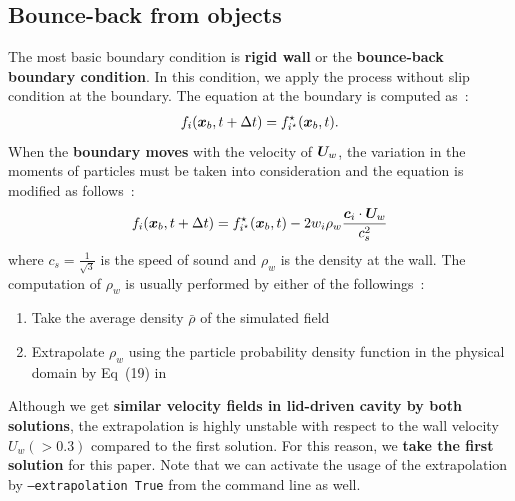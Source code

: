 \subsection{Bounce-back from objects}\label{boundary-wall-settings}
The most basic boundary condition is 
{\bf rigid wall} or the {\bf bounce-back boundary condition}.
In this condition, we apply the process without
slip condition at the boundary.
The equation at the boundary is computed as~\cite{succi2018lattice}:
\begin{equation}
\begin{aligned}
  f_i(\boldsymbol{x}_b, t + \Delta t) = f_{i^\star}^\star(\boldsymbol{x}_b, t).
\end{aligned}
\label{discretized-rigid-wall}
\end{equation}
When the {\bf boundary moves} with the velocity of
$\boldsymbol{U}_w$, the variation in the moments of particles
must be taken into consideration and the equation is
modified as follows~\cite{succi2018lattice}:
\begin{equation}
  \begin{aligned}
    f_i(\boldsymbol{x}_b, t + \Delta t) = f_{i^\star}^\star (\boldsymbol{x}_b, t) - 
    2 w_i \rho_w \frac{
      \boldsymbol{c}_i \cdot \boldsymbol{U}_w
    }{c_s^2}
  \end{aligned}
  \label{discretized-moving-wall}
\end{equation}
where $c_s = \frac{1}{\sqrt{3}}$ is the speed of sound and 
$\rho_w$ is the density at the wall.
The computation of $\rho_w$ is usually performed by
either of the followings~\cite{zou1997pressure, khajepor2019study}:
\begin{enumerate}
  \item Take the average density $\bar{\rho}$ of the simulated field
  \item Extrapolate $\rho_w$ using 
  the particle probability density function in the physical domain by Eq~(19) in \cite{zou1997pressure}
\end{enumerate}
Although we get {\bf similar velocity fields in lid-driven cavity by both solutions},
the extrapolation is highly unstable with respect to
the wall velocity $U_w (> 0.3)$ compared to the first solution.
For this reason, we {\bf take the first solution} for this paper.
Note that we can activate the usage of the extrapolation by
{\tt --extrapolation True} from the command line as well.

